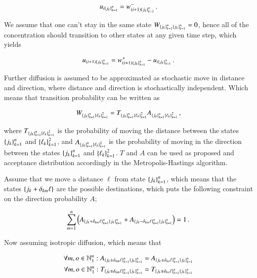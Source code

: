 \documentclass[11pt,english,a4paper]{article}
\begin{document}
\begin{flushleft}
\begin{align*}
u_{i\left\lbrace{j_k}\right\rbrace_{k=1}^n} =  w_{(i+1)\left\lbrace{j_k}\right\rbrace_{k=1}^n}^- \,.
\end{align*}


We assume that one can't stay in the same state $W_{\left\lbrace{j_k}\right\rbrace_{k=1}^n\left\lbrace{j_k}\right\rbrace_{k=1}^n} = 0$, hence all of the concentration should transition to other states at any given time step, which yields

\begin{align}
u_{(i+1)\left\lbrace{j_k}\right\rbrace_{k=1}^n} = w_{(i+1)\left\lbrace{j_k}\right\rbrace_{k=1}^n}^+ - u_{i\left\lbrace{j_k}\right\rbrace_{k=1}^n} \,.
\label{eq_37}
\end{align}

Further diffusion is assumed to be approximated as stochastic move in distance and direction, where distance and direction is stochastically independent. Which means that transition probability can be written as

\begin{align}
W_{\left\lbrace{j_k}\right\rbrace_{k=1}^n\left\lbrace{\ell_k}\right\rbrace_{k=1}^2} = T_{\left\lbrace{j_k}\right\rbrace_{k=1}^n\left\lbrace{\ell_k}\right\rbrace_{k=1}^2} A_{\left\lbrace{j_k}\right\rbrace_{k=1}^n\left\lbrace{\ell_k}\right\rbrace_{k=1}^2} \,,
\label{eq_38}
\end{align}

where $T_{\left\lbrace{j_k}\right\rbrace_{k=1}^n\left\lbrace{\ell_k}\right\rbrace_{k=1}^2}$ is the probability of moving the distance between the states $\left\lbrace{j_k}\right\rbrace_{k=1}^n$ and $\left\lbrace{\ell_k}\right\rbrace_{k=1}^2$, and $ A_{\left\lbrace{j_k}\right\rbrace_{k=1}^n\left\lbrace{\ell_k}\right\rbrace_{k=1}^2}$ is the probability of moving in the direction between the states $\left\lbrace{j_k}\right\rbrace_{k=1}^n$ and $\left\lbrace{\ell_k}\right\rbrace_{k=1}^2$. $T$ and $A$ can be used as proposed and acceptance distribution accordingly in the Metropolis-Hastings algorithm. \linebreak

Assume that we move a distance $\ell$ from state $\left\lbrace{j_k}\right\rbrace_{k=1}^n$, which means that the states $\left\lbrace{j_k+\delta_{km}\ell}\right\rbrace$ are the possible destinations, which puts the following constraint on the direction probability $A$;

\begin{align*}
\sum_{m=1}^n \left({A_{\left\lbrace{j_k+\delta_{km}\ell}\right\rbrace_{k=1}^n\left\lbrace{j_k}\right\rbrace_{k=1}^n}+A_{\left\lbrace{j_k-\delta_{km}\ell}\right\rbrace_{k=1}^n\left\lbrace{j_k}\right\rbrace_{k=1}^n}}\right) = 1 \,.
\end{align*}

Now assuming isotropic diffusion, which means that

\begin{align*}
\forall m,o\in \mathbb{N}_1^n : A_{\left\lbrace{j_k\pm\delta_{km} \ell}\right\rbrace_{k=1}^n\left\lbrace{j_k}\right\rbrace_{k=1}^n} &= A_{\left\lbrace{j_k\pm\delta_{ko} \ell}\right\rbrace_{k=1}^n\left\lbrace{j_k}\right\rbrace_{k=1}^n} \\
\forall m,o\in \mathbb{N}_1^n : T_{\left\lbrace{j_k\pm\delta_{km} \ell}\right\rbrace_{k=1}^n\left\lbrace{j_k}\right\rbrace_{k=1}^n} &= T_{\left\lbrace{j_k\pm\delta_{ko} \ell}\right\rbrace_{k=1}^n\left\lbrace{j_k}\right\rbrace_{k=1}^n}
\end{align*}


\end{flushleft}
\end{document}
